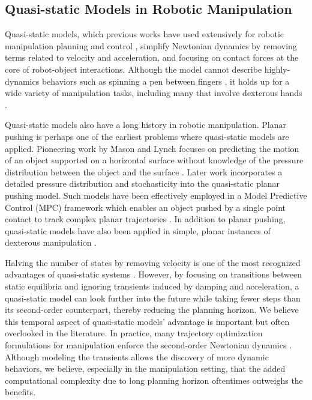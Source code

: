 \subsection{Quasi-static Models in Robotic Manipulation} \label{sec:quasi_static_background}
Quasi-static models, which previous works have used extensively for robotic manipulation planning and control \cite{mason2001mechanics, motioncones, aceituno2020global, cheng2021contact, pang2021easing}, simplify Newtonian dynamics by removing terms related to velocity and acceleration, and focusing on contact forces at the core of robot-object interactions. Although the model cannot describe highly-dynamics behaviors such as spinning a pen between fingers \cite{mordatch2012contact}, it holds up for a wide variety of manipulation tasks, including many that involve dexterous hands \cite{andrychowicz2020learning}.

Quasi-static models also have a long history in robotic manipulation. Planar pushing is perhaps one of the earliest problems where quasi-static models are applied. Pioneering work by Mason and Lynch focuses on predicting the motion of an object supported on a horizontal surface without knowledge of the pressure distribution between the object and the surface \cite{mason1986mechanics, lynch1996stable}. Later work incorporates a detailed pressure distribution \cite{goyal1991planar, howe1996practical} and stochasticity \cite{zhou2017fast} into the quasi-static planar pushing model. Such models have been effectively employed in a Model Predictive Control (MPC) framework which enables an object pushed by a single point contact to track complex planar trajectories \cite{hogan2020feedback}. In addition to planar pushing, quasi-static models have also been applied in simple, planar instances of dexterous manipulation \cite{trinkle1993dexterous, pang1996complementarity}.

Halving the number of states by removing velocity is one of the most recognized advantages of quasi-static systems \cite[]{mason2001mechanics}.
However, by focusing on transitions between static equilibria and ignoring transients induced by damping and acceleration, a quasi-static model can look further into the future while taking fewer steps than its second-order counterpart, thereby reducing the planning horizon. 
We believe this temporal aspect of quasi-static models' advantage is important but often overlooked in the literature. In practice, many trajectory optimization formulations for manipulation enforce the second-order Newtonian dynamics \cite{landry2019differentiable, kurtz2022contact}. Although modeling the transients allows the discovery of more dynamic behaviors, we believe, especially in the manipulation setting, that the added computational complexity due to long planning horizon oftentimes outweighs the benefits. 

